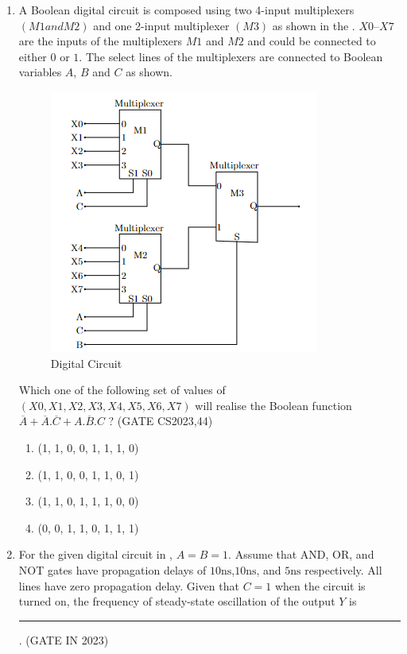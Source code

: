 \begin{enumerate}[label=\arabic*.,ref=\theenumi]
\item A Boolean digital circuit is composed using two 4-input multiplexers $(M1 and M2)$ and one 2-input multiplexer $(M3)$ as shown in the 
    .
	 $X0$–$X7$ are the inputs of the multiplexers $M1$ and $M2$ and could be connected to either $0$ or $1$. The select lines of the multiplexers are connected to Boolean variables $A$, $B$ and $C$ as shown.

\begin{figure}[H]
    \centering
        \includegraphics[width=0.75\columnwidth]{figs/Multiplexer.png}
    \caption{Digital Circuit}
    \label{fig:Multiplexer}
\end{figure}

Which one of the following set of values of $(X0, X1, X2, X3, X4, X5, X6, X7)$ will realise the Boolean function 
$\overline{A} + \overline{A}.\overline{C}+A.\overline{B}.C $ ?
\hfill(GATE CS2023,44)
 \begin{enumerate}
     \item (1, 1, 0, 0, 1, 1, 1, 0)
     \item (1, 1, 0, 0, 1, 1, 0, 1)
     \item (1, 1, 0, 1, 1, 1, 0, 0)
     \item (0, 0, 1, 1, 0, 1, 1, 1)
 \end{enumerate}
\item For the given digital circuit
in	,
	 $A = B = 1$. Assume that AND, OR, and NOT gates have propagation delays of $10\mathrm{ns}$,$10\mathrm{ns}$, and $5\mathrm{ns}$ respectively. All lines have zero
propagation delay. Given that $C = 1$ when the circuit is turned on, the frequency of steady-state oscillation of the output $Y$  is  \rule{30pt}{1pt}.
\hfill (GATE IN 2023)
\begin{figure}[H]
        \centering  
        

\end{figure}
\end{enumerate}
